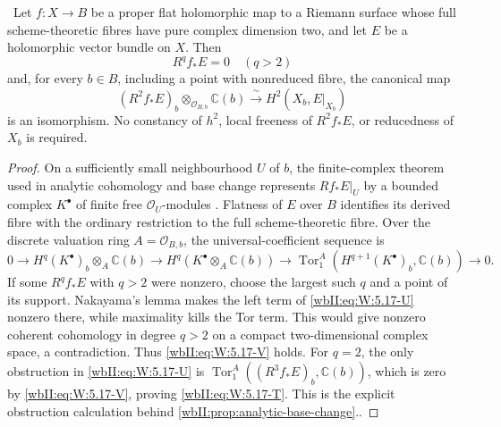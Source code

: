 \begin{corollary}
\label{wbII:cor:surface-top-base-change}
\ Let $f:X\to B$ be a proper flat holomorphic map to a Riemann
surface whose full scheme-theoretic fibres have pure complex dimension two,
and let $E$ be a holomorphic vector bundle on $X$.  Then
\[
 R^qf_*E=0\quad(q>2)
 \tag{W.15}\label{wbII:eq:W:5.17-V}
\]
and, for every $b\in B$, including a point with nonreduced fibre, the
canonical map
\[
 (R^2f_*E)_b\otimes_{\mathcal O_{B,b}}\mathbb C(b)
 \xrightarrow{\ \sim\ }H^2(X_b,E|_{X_b})
 \tag{W.16}\label{wbII:eq:W:5.17-T}
\]
is an isomorphism.  No constancy of $h^2$, local freeness of $R^2f_*E$, or
reducedness of $X_b$ is required.
\end{corollary}

\begin{proof}
On a sufficiently small neighbourhood $U$ of $b$, the finite-complex theorem
used in analytic cohomology and base change represents $Rf_*E|_U$ by a
bounded complex $K^\bullet$ of finite free $\mathcal O_U$-modules
\cite[Chapter~III, \S3, Theorem~3.4]{BS76push}.  Flatness of
$E$ over $B$ identifies its derived fibre with the ordinary restriction to
the full scheme-theoretic fibre.  Over the discrete valuation ring
$A=\mathcal O_{B,b}$, the universal-coefficient sequence is
\[
0\longrightarrow H^q(K^\bullet)_b\otimes_A\mathbb C(b)
 \longrightarrow H^q(K^\bullet\otimes_A\mathbb C(b))
 \longrightarrow
 \operatorname{Tor}_1^A(H^{q+1}(K^\bullet)_b,\mathbb C(b))
 \longrightarrow0.
\tag{W.17}\label{wbII:eq:W:5.17-U}
\]
If some $R^qf_*E$ with $q>2$ were nonzero, choose the largest such $q$ and a
point of its support.  Nakayama's lemma makes the left term of \eqref{wbII:eq:W:5.17-U}
nonzero there, while maximality kills the Tor term.  This would give nonzero
coherent cohomology in degree $q>2$ on a compact two-dimensional complex
space, a contradiction.  Thus \eqref{wbII:eq:W:5.17-V} holds.  For $q=2$, the only
obstruction in \eqref{wbII:eq:W:5.17-U} is
$\operatorname{Tor}_1^A((R^3f_*E)_b,\mathbb C(b))$, which is zero by
\eqref{wbII:eq:W:5.17-V}, proving \eqref{wbII:eq:W:5.17-T}.  This is the explicit obstruction calculation
behind \cref{wbII:prop:analytic-base-change}..
\end{proof}

